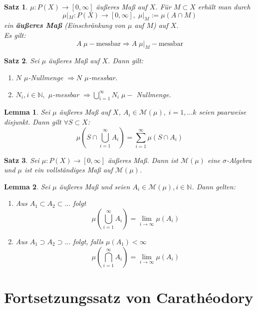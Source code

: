 \documentclass[11pt]{memoir}
\theoremstyle{changebreak}
\newtheorem{Lemma}{Lemma}[chapter]
\newtheorem{Satz}{Satz}[chapter]
\begin{document}
\begin{Satz}
$\mu: P(X) \rightarrow [0, \infty]$ äußeres Maß auf $X$. 
Für $M \subset X$ erhält man durch 
$$\mu|_M : P(X) \rightarrow [0, \infty], \; \mu|_M := \mu(A \cap M)$$ 
ein \textbf{äußeres Maß} (Einschränkung von $\mu$ auf $M$) auf $X$. \\
Es gilt: 
$$A \; \mu-\text{messbar} \Rightarrow A  \; \mu|_M -\text{messbar}$$
\end{Satz}

\begin{Satz}
Sei $\mu$ äußeres Maß auf $X$. Dann gilt:
\begin{enumerate}
	\item $N$ $\mu$-Nullmenge $\Rightarrow N$ $\mu$-messbar.
	\item $N_i, i \in \mathbb N,$ $\mu$-messbar $\Rightarrow \bigcup\limits_{i=1}^\infty N_i \; \mu-$ Nullmenge.
\end{enumerate}
\end{Satz}


\begin{Lemma}
Sei $\mu$ äußeres Maß auf $X$, $A_i \in \mathscr M(\mu),\; i = 1, ... k$ seien paarweise disjunkt. Dann gilt $\forall S \subset X$: 
$$\mu\left(S \cap \bigcup\limits_{i=1}^\infty A_i\right) = \sum\limits_{i=1}^\infty \mu(S \cap A_i)$$
\end{Lemma}

\begin{Satz}
Sei $\mu: P(X) \rightarrow [0, \infty]$ äußeres Maß. Dann ist $\mathscr M(\mu)$ eine $\sigma$-Algebra und $\mu$ ist ein vollständiges Maß auf $\mathscr M(\mu)$.
\end{Satz}

\begin{Lemma}
Sei $\mu$ äußeres Maß und seien $A_i \in \mathscr M(\mu), i \in \mathbb N$. Dann gelten:
\begin{enumerate}
	\item Aus $A_1 \subset A_2 \subset ...$ folgt 
	$$\mu\left(\bigcup\limits_{i=1}^\infty A_i\right) = \lim_{i \rightarrow \infty} \mu(A_i)$$
	\item Aus $A_1 \supset A_2 \supset ...$ folgt, falls $\mu(A_1) \less \infty$
	$$\mu\left(\bigcap\limits_{i=1}^\infty A_i\right) = \lim_{i \rightarrow \infty} \mu(A_i)$$
\end{enumerate}
\end{Lemma}


\section{Fortsetzungssatz von Carathéodory}
\end{document}

